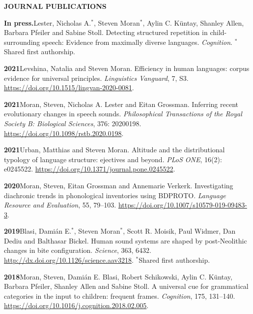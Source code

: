 \documentclass[11pt]{article}
\newcommand{\hangpara}{
 \setlength{\parindent}{0in} %
 \hangindent=0.42in %
}
\begin{document}
\clearpage
\begin{flushleft}
{\bf JOURNAL PUBLICATIONS}
\end{flushleft}


\hangpara
{\bf In press.}\hspace{1ex}Lester, Nicholas A.$^*$, Steven Moran$^*$, Aylin C. K{\"u}ntay, Shanley Allen, Barbara Pfeiler and Sabine Stoll. Detecting structured repetition in child-surrounding speech: Evidence from maximally diverse languages. \textit{Cognition}. $^*$Shared first authorship.

\hangpara
\vskip 6pt
{\bf 2021}\hspace{1ex}Levshina, Natalia and Steven Moran. Efficiency in human languages: corpus evidence for universal principles. \textit{Linguistics Vanguard}, 7, S3. \url{https://doi.org/10.1515/lingvan-2020-0081}.

\hangpara
\vskip 6pt
{\bf 2021}\hspace{1ex}Moran, Steven, Nicholas A. Lester and Eitan Grossman. Inferring recent evolutionary changes in speech sounds. \textit{Philosophical Transactions of the Royal Society B: Biological Sciences}, 376: 20200198. \url{https://doi.org/10.1098/rstb.2020.0198}.

\hangpara
\vskip 6pt
{\bf 2021}\hspace{1ex}Urban, Matthias and Steven Moran. Altitude and the distributional typology of language structure: ejectives and beyond. \textit{PLoS ONE}, 16(2): e0245522. \url{https://doi.org/10.1371/journal.pone.0245522}.

\hangpara
\vskip 6pt
{\bf 2020}\hspace{1ex}Moran, Steven, Eitan Grossman and Annemarie Verkerk. Investigating diachronic trends in phonological inventories using BDPROTO. \textit{Language Resource and Evaluation}, 55, 79--103. \url{https://doi.org/10.1007/s10579-019-09483-3}.

\hangpara
\vskip 6pt
{\bf 2019}\hspace{1ex}Blasi, Dami{\'a}n E.$^*$, Steven Moran$^*$, Scott R. Moisik, Paul Widmer, Dan Dediu and Balthasar Bickel. Human sound systems are shaped by post-Neolithic changes in bite configuration. \textit{Science}, 363, 6432. \url{http://dx.doi.org/10.1126/science.aav3218}. $^*$Shared first authorship. %

\hangpara
\vskip 6pt
{\bf 2018}\hspace{1ex}Moran, Steven, Dami{\'a}n E. Blasi, Robert Schikowski, Aylin C. K{\"u}ntay, Barbara Pfeiler, Shanley Allen and Sabine Stoll. A universal cue for grammatical categories in the input to children: frequent frames. \textit{Cognition}, 175, 131--140. \url{https://doi.org/10.1016/j.cognition.2018.02.005}. %
\end{document}
